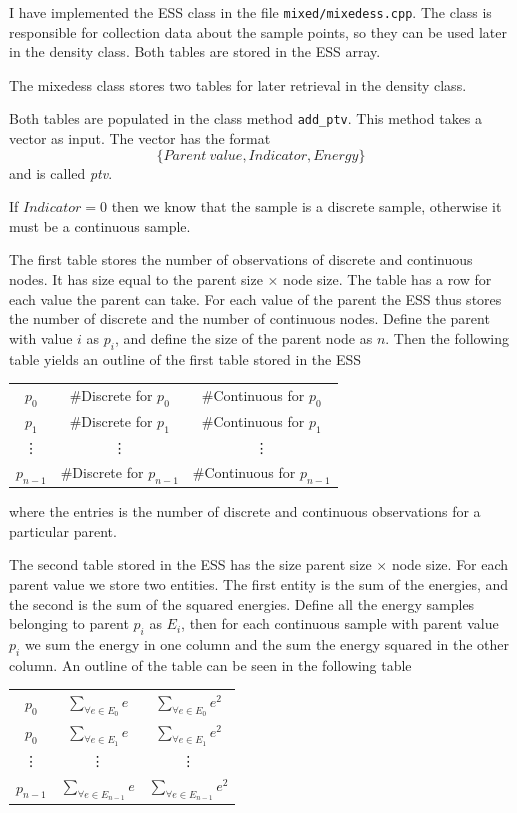 \documentclass[10pt, journal, compsoc, a4paper]{IEEEtran}
\begin{document}
I have implemented the ESS class in the file \texttt{mixed/mixedess.cpp}. The class is responsible for collection data about the sample points, so they can be used later in the density class. Both tables are stored in the ESS array.

The mixedess class stores two tables for later retrieval in the density class. 

Both tables are populated in the class method \texttt{add\_ptv}. This method takes a vector as input. The vector has the format
\begin{equation}
  \{Parent\ value, Indicator, Energy\}
\end{equation}
and is called \emph{ptv}.


If $Indicator=0$ then we know that the sample is a discrete sample, otherwise it must be a continuous sample.

The first table stores the number of observations of discrete and continuous nodes. It has size equal to the parent size $\times$ node size. The table has a row for each value the parent can take. For each value of the parent the ESS thus stores the number of discrete and the number of continuous nodes. Define the parent with value $i$ as $p_i$, and define the size of the parent node as $n$. Then the following table yields an outline of the first table stored in the ESS
\begin{center}
  \begin{tabular}{c | c | c}
  $p_0$ & \#Discrete for $p_0$ & \#Continuous for $p_0$ \\
  $p_1$ & \#Discrete for $p_1$ & \#Continuous for $p_1$ \\
  \vdots & \vdots & \vdots \\
  $p_{n-1}$ & \#Discrete for $p_{n-1}$ & \#Continuous for $p_{n-1}$ 
  \end{tabular}  
\end{center}
where the entries is the number of discrete and continuous observations for a particular parent.

The second table stored in the ESS has the size parent size $\times$ node size. For each parent value we store two entities. The first entity is the sum of the energies, and the second is the sum of the squared energies. Define all the energy samples belonging to parent $p_i$ as $E_i$, then for each continuous sample with parent value $p_i$ we sum the energy in one column and the sum the energy squared in the other column. An outline of the table can be seen in the following table
\begin{center}
  \begin{tabular}{c | c | c}
  $p_0$ & $\sum_{\forall e \in E_0} e$ & $\sum_{\forall e \in E_0} e^2$ \\
  $p_0$ & $\sum_{\forall e \in E_1} e$ & $\sum_{\forall e \in E_1} e^2$ \\
  \vdots & \vdots & \vdots \\
  $p_{n-1}$ & $\sum_{\forall e \in E_{n-1}} e$ & $\sum_{\forall e \in E_{n-1}} e^2$ \\
  \end{tabular}  
\end{center}
\end{document}
